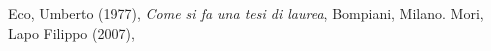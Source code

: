 \begin{thebibliography}{9}
Eco, Umberto (1977),
\emph{Come si fa una tesi di
laurea}, Bompiani, Milano.
Mori, Lapo Filippo (2007),
\end{thebibliography}